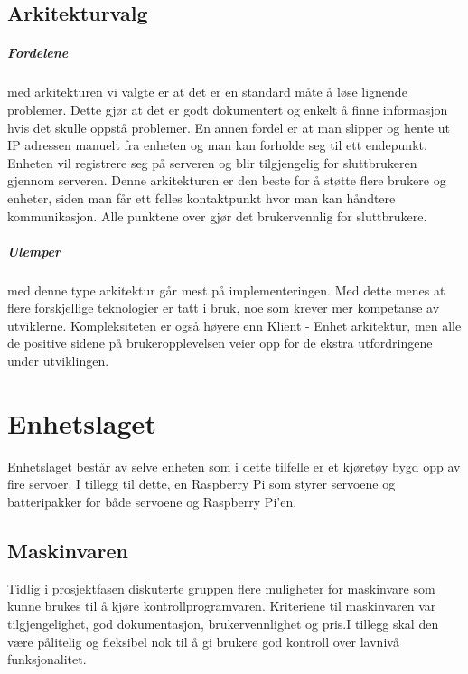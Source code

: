 \documentclass[12pt]{report}
\begin{document}
\section{Arkitekturvalg}

\paragraph{Fordelene} med arkitekturen vi valgte er at det er en standard måte å løse lignende problemer. Dette gjør at det er godt dokumentert og enkelt å finne informasjon hvis det skulle oppstå problemer. En annen fordel er at man slipper og hente ut IP adressen manuelt fra enheten og man kan forholde seg til ett endepunkt. Enheten vil registrere seg på serveren og blir tilgjengelig for sluttbrukeren gjennom serveren. Denne arkitekturen er den beste for å støtte flere brukere og enheter, siden man får ett felles kontaktpunkt hvor man kan håndtere kommunikasjon. Alle punktene over gjør det brukervennlig for sluttbrukere. \newline

\paragraph{Ulemper} med denne type arkitektur går mest på implementeringen. Med dette menes at flere forskjellige teknologier er tatt i bruk, noe som krever mer kompetanse av utviklerne. Kompleksiteten er også høyere enn Klient - Enhet arkitektur, men alle de positive sidene på brukeropplevelsen veier opp for de ekstra utfordringene under utviklingen. 


\chapter{Enhetslaget}
Enhetslaget består av selve enheten som i dette tilfelle er et kjøretøy bygd opp av fire servoer. I tillegg til dette, en Raspberry Pi som styrer servoene og batteripakker for både servoene og Raspberry Pi’en.

\section{Maskinvaren}
Tidlig i prosjektfasen diskuterte gruppen flere muligheter for maskinvare som kunne brukes til å kjøre kontrollprogramvaren. Kriteriene til maskinvaren var tilgjengelighet, god dokumentasjon, brukervennlighet og pris.I tillegg skal den være pålitelig og fleksibel nok til å gi brukere god kontroll over lavnivå funksjonalitet. 
\end{document}
